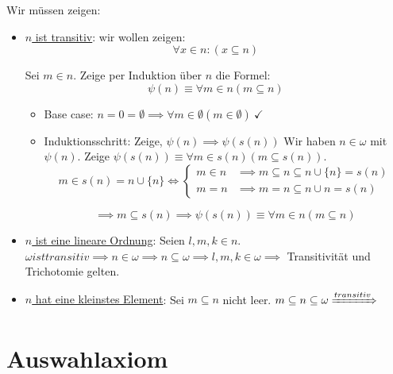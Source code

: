 \documentclass[12pt]{article}
\begin{document}
\begin{proofbox}
    Wir müssen zeigen:

    \begin{itemize}
        \item \underline{$n$ ist transitiv}: wir wollen zeigen:
        $$
            \forall x \in n : (x \subseteq n)
        $$

        Sei $m \in n$. Zeige per Induktion über $n$ die Formel: 
        $$
            \psi(n) \equiv \forall m \in n (m \subseteq n)
        $$

        \begin{itemize}
            \item Base case: $n = 0 = \emptyset \implies \forall m \in \emptyset (m \in \emptyset) \ \checkmark$
            \item Induktionsschritt: Zeige, $\psi(n) \implies \psi(s(n))$
            Wir haben $n \in \omega$ mit $\psi(n)$. Zeige $\psi(s(n)) \equiv \forall m \in s(n) (m \subseteq s(n))$. 
            $$
            m \in s(n) = n \cup \{n\} \iff \begin{cases}
                m \in n & \implies m \subseteq n \subseteq n \cup \{n\} = s(n) \\
                m = n & \implies m = n \subseteq n \cup {n} = s(n)
            \end{cases}
            $$

            $$
                \implies m \subseteq s(n) \implies \psi(s(n)) \equiv \forall m \in n (m \subseteq n)
            $$
        \end{itemize}

        \item \underline{$n$ ist eine lineare Ordnung}: Seien $l, m, k \in n$. $\omega ist transitiv \implies n \in \omega \implies n \subseteq \omega \implies l, m, k \in \omega \implies$ Transitivität und Trichotomie gelten.
        \item \underline{$n$ hat eine kleinstes Element}: Sei $m \subseteq n$ nicht leer. $m \subseteq n \subseteq \omega \xRightarrow{transitiv} $
    \end{itemize}
\end{proofbox}

\section{Auswahlaxiom}
\end{document}
